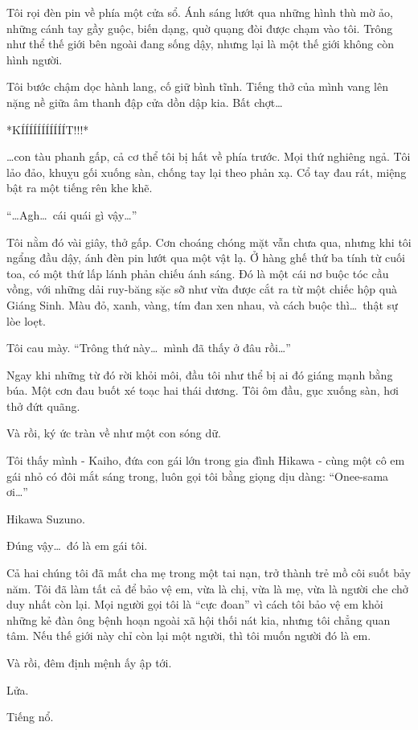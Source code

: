 \documentclass[../main.tex]{subfiles}
\begin{document}
Tôi rọi đèn pin về phía một cửa sổ. Ánh sáng lướt qua những hình thù mờ ảo, những cánh tay gầy guộc, biến dạng, quờ quạng đòi được chạm vào tôi. Trông như thể thế giới bên ngoài đang sống dậy, nhưng lại là một thế giới không còn hình người.

Tôi bước chậm dọc hành lang, cố giữ bình tĩnh. Tiếng thở của mình vang lên nặng nề giữa âm thanh đập cửa dồn dập kia. Bất chợt\dots

*KÍÍÍÍÍÍÍÍÍÍÍT!!!*

\dots con tàu phanh gấp, cả cơ thể tôi bị hất về phía trước. Mọi thứ nghiêng ngả. Tôi lảo đảo, khuỵu gối xuống sàn, chống tay lại theo phản xạ. Cổ tay đau rát, miệng bật ra một tiếng rên khe khẽ.

``\dots Agh\dots\ cái quái gì vậy\dots''

Tôi nằm đó vài giây, thở gấp. Cơn choáng chóng mặt vẫn chưa qua, nhưng khi tôi ngẩng đầu dậy, ánh đèn pin lướt qua một vật lạ. Ở hàng ghế thứ ba tính từ cuối toa, có một thứ lấp lánh phản chiếu ánh sáng. Đó là một cái nơ buộc tóc cầu vồng, với những dải ruy-băng sặc sỡ như vừa được cắt ra từ một chiếc hộp quà Giáng Sinh. Màu đỏ, xanh, vàng, tím đan xen nhau, và cách buộc thì\dots\ thật sự lòe loẹt.

Tôi cau mày. ``Trông thứ này\dots\ mình đã thấy ở đâu rồi\dots''

Ngay khi những từ đó rời khỏi môi, đầu tôi như thể bị ai đó giáng mạnh bằng búa. Một cơn đau buốt xé toạc hai thái dương. Tôi ôm đầu, gục xuống sàn, hơi thở đứt quãng.

Và rồi, ký ức tràn về như một con sóng dữ.

Tôi thấy mình - Kaiho, đứa con gái lớn trong gia đình Hikawa - cùng một cô em gái nhỏ có đôi mắt sáng trong, luôn gọi tôi bằng giọng dịu dàng: ``Onee-sama ơi\dots''

Hikawa Suzuno.

Đúng vậy\dots\ đó là em gái tôi.

Cả hai chúng tôi đã mất cha mẹ trong một tai nạn, trở thành trẻ mồ côi suốt bảy năm. Tôi đã làm tất cả để bảo vệ em, vừa là chị, vừa là mẹ, vừa là người che chở duy nhất còn lại. Mọi người gọi tôi là ``cực đoan'' vì cách tôi bảo vệ em khỏi những kẻ đàn ông bệnh hoạn ngoài xã hội thối nát kia, nhưng tôi chẳng quan tâm. Nếu thế giới này chỉ còn lại một người, thì tôi muốn người đó là em.

Và rồi, đêm định mệnh ấy ập tới.

Lửa.

Tiếng nổ.
\end{document}
